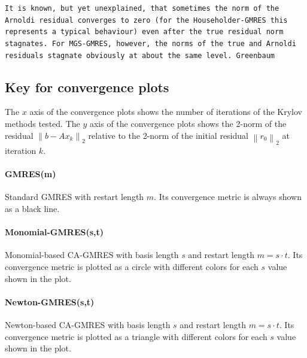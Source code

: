 \documentclass{scrartcl}
\numberwithin{equation}{section}
\newcommand{\norm}[1]{\left\lVert#1\right\rVert}
\begin{document}
\texttt{It is known, but yet unexplained, that sometimes the norm of the Arnoldi residual converges to zero (for the Householder-GMRES this represents a typical behaviour) even after the true residual norm stagnates. For MGS-GMRES, however, the norms of the true and Arnoldi residuals stagnate obviously at about the same level. Greenbaum~\cite{Greenbaum97numericalbehaviour}}

\subsection{Key for convergence plots}
The $x$ axis of the convergence plots shows the number of iterations of the Krylov methods tested. The $y$ axis of the convergence plots shows the 2-norm of the residual $\norm{b - Ax_k}_2$ relative to the 2-norm of the initial residual $\norm{r_0}_2$ at iteration $k$.
\paragraph{GMRES(m)} Standard GMRES with restart length $m$. Its convergence metric is always shown as a black line.

\paragraph{Monomial-GMRES(s,t)} Monomial-based CA-GMRES with basis length $s$ and restart length $m = s \cdot t$. Its convergence metric is plotted as a circle with different colors for each $s$ value shown in the plot.

\paragraph{Newton-GMRES(s,t)} Newton-based CA-GMRES with basis length $s$ and restart length $m = s \cdot t$. Its convergence metric is plotted as a triangle with different colors for each $s$ value shown in the plot.
\end{document}
